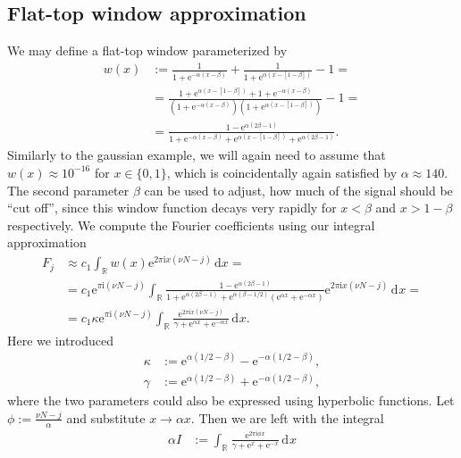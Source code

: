 \documentclass[english, parskip=full]{scrartcl}
\newcommand{\intx}{}
\newcommand{\intr}{}
\newcommand{\kla}{}
\newcommand{\I}{\text{i}}
\renewcommand{\i}{\text{i}}
\newcommand{\e}{\text{e}}
\begin{document}
\subsection{Flat-top window approximation}
We may define a flat-top window parameterized by
\begin{align}
w(x) &:= \frac{1}{1 + \e^{-\alpha (x-\beta)}} + \frac{1}{1 + \e^{\alpha (x-[1-\beta])}} - 1 = \\
&= \frac{1 + \e^{\alpha (x-[1-\beta])} + 1 + \e^{-\alpha (x-\beta)}}{\kla\left( 1 + \e^{-\alpha (x-\beta)} \right) \kla\left( 1 + \e^{\alpha (x-[1-\beta])} \right)} - 1 = \\
&= \frac{1 - \e^{\alpha (2\beta -1)}}{1 + \e^{-\alpha (x-\beta)}  + \e^{\alpha (x-[1-\beta])} + \e^{\alpha (2\beta -1)}}.
\end{align}
Similarly to the gaussian example, we will again need to assume that $w(x)\approx 10^{-16}$ for $x\in\{0,1\}$, which is coincidentally again satisfied by $\alpha\approx 140$.
The second parameter $\beta$ can be used to adjust, how much of the signal should be ``cut off'', since this window function decays very rapidly for $x < \beta$ and $x > 1 - \beta$ respectively.
We compute the Fourier coefficients using our integral approximation
\begin{align}
F_j&\approx c_1\intx\int_{\mathbb{R}}^{} w(x) \e^{2\pi\I x\kla\left( {\nu N - j} \right)}\,\mathrm{d}x=\\
&=c_1\e^{\pi\I \kla\left( {\nu N - j} \right)} \intr\int_{\mathbb{R}^{ }} \frac{1 - \e^{\alpha (2\beta -1)}}{1 + \e^{\alpha (2\beta -1)} + \e^{\alpha (\beta-1/2)}\kla\left( \e^{\alpha x} + \e^{-\alpha x} \right)} \e^{2\pi\I x\kla\left( {\nu N - j} \right)} \, \mathrm{d}^{ }x = \\
&= c_1\kappa\e^{\pi\I \kla\left( {\nu N - j} \right)} \intr\int_{\mathbb{R}^{ }} \frac{\e^{2\pi\I x\kla\left( {\nu N - j} \right)}}{\gamma +  \e^{\alpha x} + \e^{-\alpha x} }  \, \mathrm{d}^{ }x. \label{eqn:Fj-flattop-integral}
\end{align}
Here we introduced 
\begin{align}
\kappa &:= \e^{\alpha(1/2 - \beta)} - \e^{-\alpha(1/2 - \beta)},\\
\gamma &:= \e^{\alpha(1/2 - \beta)} + \e^{-\alpha(1/2 - \beta)},
\end{align}
where the two parameters could also be expressed using hyperbolic functions.
Let $\phi := \frac{\nu N-j}{\alpha}$ and substitute $x\rightarrow \alpha x$.
Then we are left with the integral
\begin{align}
\alpha I &:= \intr\int_{\mathbb{R}^{ }} \frac{\e^{2\pi\i\phi x}}{\gamma + \e^x + \e^{-x}} \, \mathrm{d}^{ }x
\end{align}
\end{document}
